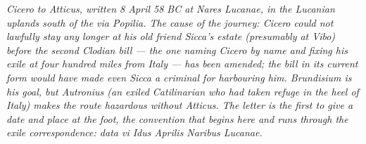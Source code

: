 
\textit{Cicero to Atticus, written 8 April 58 BC at Nares
Lucanae, in the Lucanian uplands south of the via Popilia.
The cause of the journey: Cicero could not lawfully stay any
longer at his old friend Sicca's estate (presumably at Vibo)
before the second Clodian bill --- the one naming Cicero by
name and fixing his exile at four hundred miles from Italy
--- has been amended; the bill in its current form would have
made even Sicca a criminal for harbouring him. Brundisium is
his goal, but Autronius (an exiled Catilinarian who had taken
refuge in the heel of Italy) makes the route hazardous
without Atticus. The letter is the first to give a date and
place at the foot, the convention that begins here and runs
through the exile correspondence: \textit{data vi Idus
Aprilis Naribus Lucanae}.}
